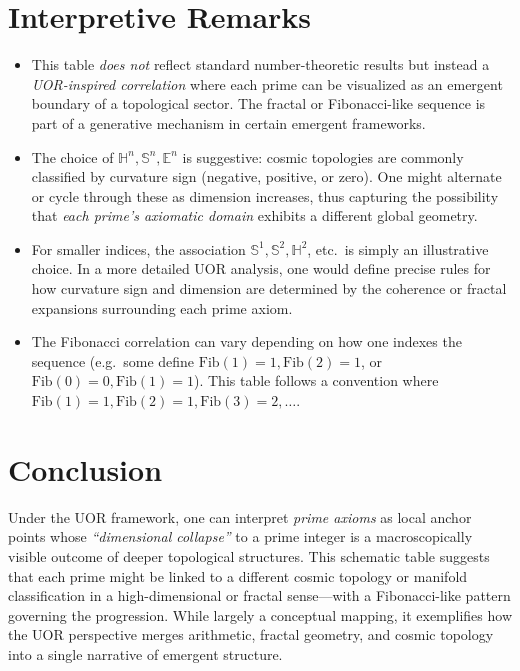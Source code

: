 \documentclass[11pt]{article}
\begin{document}
\section*{Interpretive Remarks}
\begin{itemize}
\item This table \emph{does not} reflect standard number-theoretic results but instead a \emph{UOR-inspired correlation} where each prime can be visualized as an emergent boundary of a topological sector. The fractal or Fibonacci-like sequence is part of a generative mechanism in certain emergent frameworks.
\item The choice of \(\mathbb{H}^n, \mathbb{S}^n, \mathbb{E}^n\) is suggestive: cosmic topologies are commonly classified by curvature sign (negative, positive, or zero).  One might alternate or cycle through these as dimension increases, thus capturing the possibility that \emph{each prime’s axiomatic domain} exhibits a different global geometry.
\item For smaller indices, the association \(\mathbb{S}^1, \mathbb{S}^2, \mathbb{H}^2\), etc.\ is simply an illustrative choice. In a more detailed UOR analysis, one would define precise rules for how curvature sign and dimension are determined by the coherence or fractal expansions surrounding each prime axiom.
\item The Fibonacci correlation can vary depending on how one indexes the sequence (e.g.\ some define \(\mathrm{Fib}(1)=1, \mathrm{Fib}(2)=1\), or \(\mathrm{Fib}(0)=0, \mathrm{Fib}(1)=1\)).  This table follows a convention where \(\mathrm{Fib}(1)=1,\mathrm{Fib}(2)=1,\mathrm{Fib}(3)=2,\ldots\).
\end{itemize}

\section*{Conclusion}
Under the UOR framework, one can interpret \emph{prime axioms} as local anchor points whose \emph{``dimensional collapse''} to a prime integer is a macroscopically visible outcome of deeper topological structures.  This schematic table suggests that each prime might be linked to a different cosmic topology or manifold classification in a high-dimensional or fractal sense---with a Fibonacci-like pattern governing the progression.  While largely a conceptual mapping, it exemplifies how the UOR perspective merges arithmetic, fractal geometry, and cosmic topology into a single narrative of emergent structure.
\end{document}

